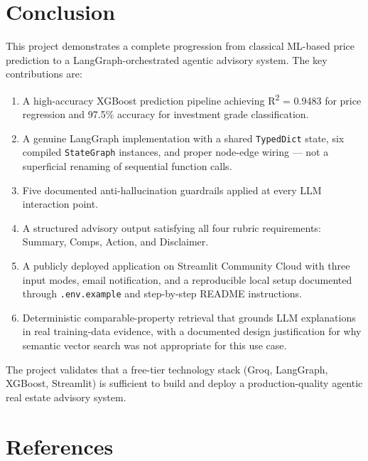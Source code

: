 \documentclass[12pt,a4paper]{article}
\begin{document}
\section{Conclusion}

This project demonstrates a complete progression from classical ML-based price prediction to a LangGraph-orchestrated agentic advisory system. The key contributions are:

\begin{enumerate}[leftmargin=1.5em]
  \item A high-accuracy XGBoost prediction pipeline achieving R\textsuperscript{2} = 0.9483 for price regression and 97.5\% accuracy for investment grade classification.
  \item A genuine LangGraph implementation with a shared \texttt{TypedDict} state, six compiled \texttt{StateGraph} instances, and proper node-edge wiring --- not a superficial renaming of sequential function calls.
  \item Five documented anti-hallucination guardrails applied at every LLM interaction point.
  \item A structured advisory output satisfying all four rubric requirements: Summary, Comps, Action, and Disclaimer.
  \item A publicly deployed application on Streamlit Community Cloud with three input modes, email notification, and a reproducible local setup documented through \texttt{.env.example} and step-by-step README instructions.
  \item Deterministic comparable-property retrieval that grounds LLM explanations in real training-data evidence, with a documented design justification for why semantic vector search was not appropriate for this use case.
\end{enumerate}

The project validates that a free-tier technology stack (Groq, LangGraph, XGBoost, Streamlit) is sufficient to build and deploy a production-quality agentic real estate advisory system.

\section*{References}
\end{document}
